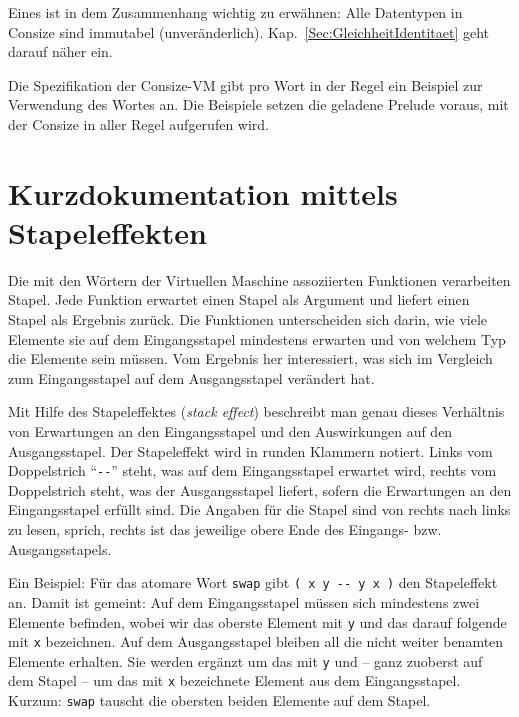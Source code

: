Eines ist in dem Zusammenhang wichtig zu erwähnen: Alle Datentypen in Consize sind immutabel (unveränderlich). Kap.~\ref{Sec:GleichheitIdentitaet} geht darauf näher ein. 


Die Spezifikation der Consize-VM gibt pro Wort in der Regel ein Beispiel zur Verwendung des Wortes an. Die Beispiele setzen die geladene Prelude voraus, mit der Consize in aller Regel aufgerufen wird.

\section{Kurzdokumentation mittels Stapeleffekten}

Die mit den Wörtern der Virtuellen Maschine assoziierten Funktionen verarbeiten Stapel. Jede Funktion erwartet einen Stapel als Argument und liefert einen Stapel als Ergebnis zurück. Die Funktionen unterscheiden sich darin, wie viele Elemente sie auf dem Eingangsstapel mindestens erwarten und von welchem Typ die Elemente sein müssen. Vom Ergebnis her interessiert, was sich im Vergleich zum Eingangsstapel auf dem Ausgangsstapel verändert hat.

Mit Hilfe des Stapeleffektes (\emph{stack effect}) beschreibt man genau dieses Verhältnis von Erwartungen an den Eingangsstapel und den Auswirkungen auf den Ausgangsstapel. Der Stapeleffekt wird in runden Klammern notiert. Links vom Doppelstrich "`\verb|--|"' steht, was auf dem Eingangsstapel erwartet wird, rechts vom Doppelstrich steht, was der Ausgangsstapel liefert, sofern die Erwartungen an den Eingangsstapel erfüllt sind. Die Angaben für die Stapel sind von rechts nach links zu lesen, sprich, rechts ist das jeweilige obere Ende des Eingangs- bzw. Ausgangsstapels.

Ein Beispiel: Für das atomare Wort \verb|swap| gibt \verb|( x y -- y x )| den Stapeleffekt an. Damit ist gemeint: Auf dem Eingangsstapel müssen sich mindestens zwei Elemente befinden, wobei wir das oberste Element mit \verb|y| und das darauf folgende mit \verb|x| bezeichnen. Auf dem Ausgangsstapel bleiben all die nicht weiter benamten Elemente erhalten. Sie werden ergänzt um das mit \verb|y| und -- ganz zuoberst auf dem Stapel -- um das mit \verb|x| bezeichnete Element aus dem Eingangsstapel. Kurzum: \verb|swap| tauscht die obersten beiden Elemente auf dem Stapel.

